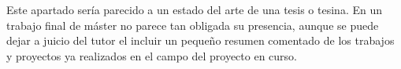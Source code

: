 
Este apartado sería parecido a un estado del arte de una tesis o tesina. En un trabajo final de máster no parece tan obligada su presencia, aunque se puede dejar a juicio del tutor el incluir un pequeño resumen comentado de los trabajos y proyectos ya realizados en el campo del proyecto en curso. 
